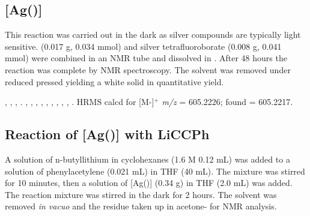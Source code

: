 
\subsection*{\texorpdfstring{[Ag(\tBuxantphos)]} A} %


This reaction was carried out in the dark as silver compounds are typically light sensitive.  \tBuXantphos{} (0.017 g, 0.034 mmol) and silver tetrafluoroborate (0.008 g, 0.041 mmol) were combined in an NMR tube and dissolved in .  After 48 hours the reaction was complete by NMR spectroscopy.  The solvent was removed under reduced pressed yielding a white solid in quantitative yield.  

,
,
,
.
,
,
,
,
,
,
,
,
,
.
HRMS calcd for  [M-]$^+$ \emph{m/z} = 605.2226; found = 605.2217.

\subsection*{Reaction of \texorpdfstring{[Ag(\tBusixantphos)]} A with LiCCPh}

A solution of n-butyllithium in cyclohexanes (1.6 M 0.12 mL) was added to a solution of phenylacetylene (0.021 mL) in THF (40 mL).  The mixture was stirred for 10 minutes, then a solution of [Ag(\tBusixantphos)] (0.34 g) in THF (2.0 mL) was added.  The reaction mixture was stirred in the dark for 2 hours.  The solvent was removed \emph{in vacuo} and the residue taken up in acetone- for NMR analysis.   

